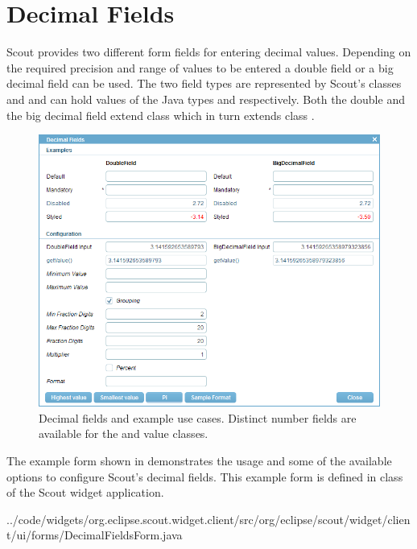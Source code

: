 \documentclass[a4paper,10pt,twoside]{book}
\begin{document}
\section{Decimal Fields}

Scout provides two different form fields for entering decimal values. 
Depending on the required precision and range of values to be entered a double field or a big decimal field can be used. 
The two field types are represented by Scout's classes  and  and can hold values of the Java types  and  respectively. 
Both the double and the big decimal field extend class  which in turn extends class .

\begin{figure}
\includegraphics[width=15cm]{decimalfield.png}
\caption{Decimal fields and example use cases.
Distinct number fields are available for the  and  value classes.
}
\end{figure}

The example form shown in  demonstrates the usage and some of the available options to configure Scout's decimal fields.
This example form is defined in class  of the Scout widget application. 


{../code/widgets/org.eclipse.scout.widget.client/src/org/eclipse/scout/widget/client/ui/forms/DecimalFieldsForm.java}
\end{document}

